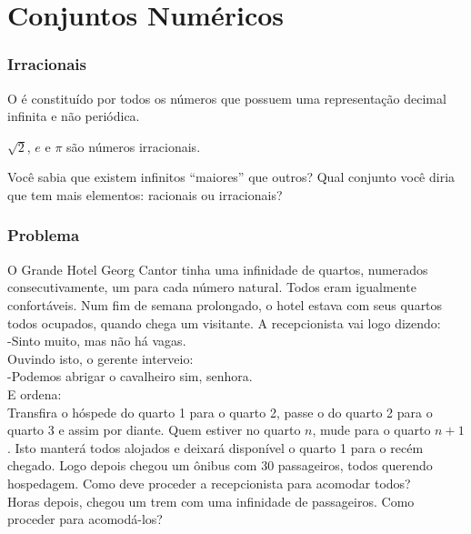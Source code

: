 \section{Conjuntos Numéricos}
\begin{frame}
    \frametitle{Irracionais} 
    \begin{definicao}
    O  é constituído por todos os
    números que possuem uma representação decimal infinita e não
    periódica.
    \end{definicao}\pause
    
    \begin{exemplo}
    $\sqrt 2$, $e$ e $\pi$ são números irracionais.
    \end{exemplo}
    
    Você sabia que existem infinitos ``maiores'' que outros? Qual
    conjunto você diria que tem mais elementos: racionais ou
    irracionais?
    \end{frame}
    
    
    \begin{frame}
    \frametitle{Problema} 
    
    O Grande Hotel Georg Cantor tinha uma infinidade de quartos,
    numerados consecutivamente, um para cada número natural. Todos eram
    igualmente confortáveis. Num fim de semana prolongado, o hotel
    estava com seus quartos todos ocupados, quando chega um visitante. A
    recepcionista vai logo dizendo: \\
    -Sinto muito, mas não há vagas. \\
    Ouvindo isto, o gerente interveio: \\
    -Podemos abrigar o cavalheiro sim, senhora. \\
    E ordena:\pause \\ 
    Transfira o hóspede do quarto 1 para o quarto 2, passe o do quarto 2
    para o quarto 3 e assim por diante. Quem estiver no quarto $n$, mude
    para o quarto $n+1$. Isto manterá todos alojados e deixará
    disponível o quarto 1 para o recém chegado. \pause Logo depois chegou um
    ônibus com 30 passageiros, todos querendo hospedagem. Como deve
    proceder a recepcionista para acomodar todos? \pause
    \\ Horas depois, chegou um trem com uma infinidade de
    passageiros. Como proceder para acomodá-los?
    
    
    \end{frame}
    
